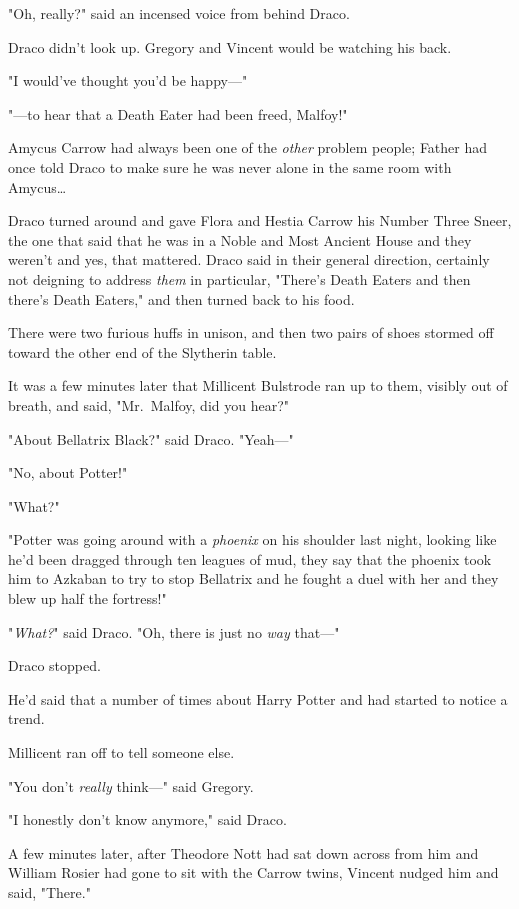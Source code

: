 "Oh, really?" said an incensed voice from behind Draco.

Draco didn't look up. Gregory and Vincent would be watching his back.

"I would've thought you'd be happy---"

"---to hear that a Death Eater had been freed, Malfoy!"

Amycus Carrow had always been one of the \emph{other} problem people; Father 
had once told Draco to make sure he was never alone in the same room with 
Amycus{\ldots}

Draco turned around and gave Flora and Hestia Carrow his Number Three Sneer, 
the one that said that he was in a Noble and Most Ancient House and they 
weren't and yes, that mattered. Draco said in their general direction, 
certainly not deigning to address \emph{them} in particular, "There's Death 
Eaters and then there's Death Eaters," and then turned back to his food.

There were two furious huffs in unison, and then two pairs of shoes stormed off 
toward the other end of the Slytherin table.

It was a few minutes later that Millicent Bulstrode ran up to them, visibly out 
of breath, and said, "Mr.~Malfoy, did you hear?"

"About Bellatrix Black?" said Draco. "Yeah---"

"No, about Potter!"

"What?"

"Potter was going around with a \emph{phoenix} on his shoulder last night, 
looking like he'd been dragged through ten leagues of mud, they say that the 
phoenix took him to Azkaban to try to stop Bellatrix and he fought a duel with 
her and they blew up half the fortress!"

"\emph{What?}" said Draco. "Oh, there is just no \emph{way} that---"

Draco stopped.

He'd said that a number of times about Harry Potter and had started to notice a 
trend.

Millicent ran off to tell someone else.

"You don't \emph{really} think---" said Gregory.

"I honestly don't know anymore," said Draco.

A few minutes later, after Theodore Nott had sat down across from him and 
William Rosier had gone to sit with the Carrow twins, Vincent nudged him and 
said, "There."

